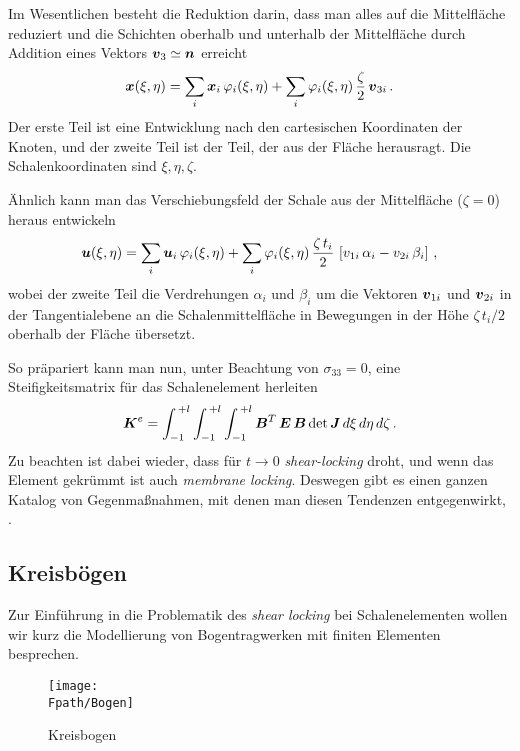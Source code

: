 Im Wesentlichen besteht die Reduktion darin, dass man alles auf die Mittelfl\"{a}che
reduziert und die Schichten oberhalb und unterhalb der Mittelfl\"{a}che durch Addition eines
Vektors $\mbox{\boldmath $v$}_3 \simeq \mbox{\boldmath $n$}$ erreicht
\begin{align}
\mbox{\boldmath $x$}(\xi,\eta) = \sum_i \mbox{\boldmath $x$}_i\,\varphi_i(\xi,\eta) + \sum_i
\varphi_i(\xi,\eta)\,\frac{\zeta}{2}\,\mbox{\boldmath $v$}_{3i}\,.
\end{align}
Der erste Teil ist eine Entwicklung nach den cartesischen Koordinaten der Knoten, und der
zweite Teil ist der Teil, der aus der Fl\"{a}che herausragt. Die Schalenkoordinaten sind
$\xi,\eta,\zeta$.

\"{A}hnlich kann man das Verschiebungsfeld der Schale aus der Mittelfl\"{a}che ($\zeta = 0$)
heraus entwickeln
\begin{align}
\mbox{\boldmath $u$}(\xi,\eta) = \sum_i \mbox{\boldmath $u$}_i\,\varphi_i(\xi,\eta) + \sum_i
\varphi_i(\xi,\eta)\,\frac{\zeta\,t_i}{2}\, \left[ v_{1i}\,\alpha_i -
v_{2i}\,\beta_i\right]\,,
\end{align}
wobei der zweite Teil die Verdrehungen $\alpha_i$ und $\beta_i$ um die Vektoren $\mbox{\boldmath $v$}_{1i}$ und $\mbox{\boldmath $v$}_{2i}$ in der Tangentialebene an die Schalenmittelfl\"{a}che in
Bewegungen in der H\"{o}he $\zeta \,t_i/2$ oberhalb der Fl\"{a}che \"{u}bersetzt.

So pr\"{a}pariert kann man nun, unter Beachtung von $\sigma_{33} = 0$, eine
Steifigkeitsmatrix f\"{u}r das Schalenelement herleiten
\begin{align}
\mbox{\boldmath $K$}^e = \int_{-1}^{\,+l} \int_{-1}^{\,+l} \int_{-1}^{\,+l} \mbox{\boldmath $B$}^T\,\mbox{\boldmath $E$}\,\mbox{\boldmath $B$}\,\mbox{det}\,\mbox{\boldmath $J$}\,d\xi\,d\eta\,d\zeta\,.
\end{align}
Zu beachten ist dabei wieder, dass f\"{u}r $t \to 0$ {\em shear-locking\/} droht, und wenn das
Element gekr\"{u}mmt ist auch {\em membrane locking\/}. Deswegen gibt es einen ganzen Katalog
von Gegenma{\ss}nahmen, mit denen man diesen Tendenzen entgegenwirkt, \cite{Bathe}.

{\textcolor{sectionTitleBlue}{\section{Kreisb\"{o}gen}}}\label{Kreisbogen}
Zur Einf\"{u}hrung in die Problematik des {\em shear locking\/} bei Schalenelementen wollen
wir kurz die Modellierung von Bogentragwerken mit finiten Elementen besprechen.
\begin{figure}[h]
\if {} \sidecaption \fi
\texttt{[image: \\Fpath/Bogen]}
\caption{{Kreisbogen}}\label{Bogen}
\end{figure}

